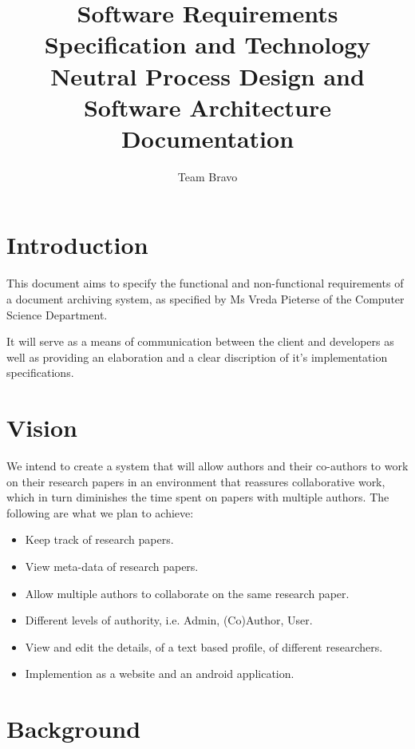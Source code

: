\documentclass[11pt]{article}
\author{Team Bravo}
\title{Software Requirements Specification and Technology Neutral Process Design and Software Architecture Documentation}
\begin{document}
	\setlength{\parskip}{6pt}
	
	
	
	\renewcommand{\thesection}{\arabic{section}}
	
	\newpage
	
	\tableofcontents
	
	\newpage
	
	\section{Introduction}
	
	This document aims to specify the functional and non-functional requirements of a document archiving system, as specified by Ms Vreda Pieterse of the Computer Science Department.
	
	It will serve as a means of communication between the client and developers as well as providing an elaboration and a clear discription of it's implementation specifications.
	
	\section{Vision}
	
	We intend to create a system that will allow authors and their co-authors to work on their research papers in an environment that reassures collaborative work, which in turn diminishes the time spent on papers with multiple authors. The following are what we plan to achieve:
	
	\begin{itemize}
		\item Keep track of research papers.
		\item View meta-data of research papers.
		\item Allow multiple authors to collaborate on the same research paper.
		\item Different levels of authority, i.e. Admin, (Co)Author, User.
		\item View and edit the details, of a text based profile, of different researchers.
		\item Implemention as a website and an android application.
	\end{itemize}
	
	\section{Background}
	
\end{document}
